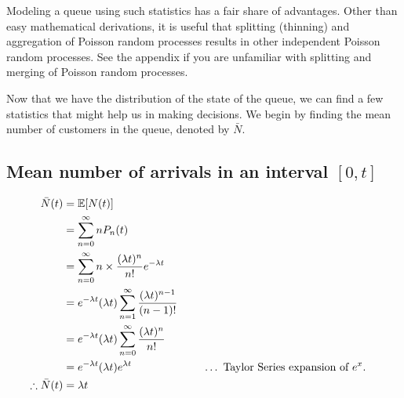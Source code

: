 \documentclass[11pt, a4paper]{report}
\begin{document}

Modeling a queue using such statistics has a fair share of advantages. Other than easy mathematical derivations, it is useful that splitting (thinning) and aggregation of Poisson random processes results in other independent Poisson random processes. See the appendix if you are unfamiliar with splitting and merging of Poisson random processes. 


Now that we have the distribution of the state of the queue, we can find a few statistics that might help us in making decisions. We begin by finding the mean number of customers in the queue, denoted by $\bar{N}$.

\subsection{Mean number of arrivals in an interval $[0, t]$}
\begin{subequations}
    \begin{align}
        \bar{N}(t) &= {\mathbb{E}}[N(t)] \\
        &= \sum_{n=0}^{\infty} n P_n(t) \\
        &= \sum_{n=0}^{\infty} n \times \frac{(\lambda t)^n}{n!} e^{-\lambda t} \\
        &= e^{-\lambda t} (\lambda t) \sum_{n=1}^{\infty} \frac{(\lambda t)^{n-1}}{(n-1)!} \\
        &= e^{-\lambda t} (\lambda t) \sum_{n=0}^{\infty} \frac{(\lambda t)^n}{n!} \\
        &=  e^{-\lambda t} (\lambda t) e^{\lambda t} &&\quad\ \ldots\ \text{Taylor Series expansion of }e^x.\\
        \therefore \bar{N}(t) &= \lambda t
    \end{align}
    \label{eq:Meanarr}
\end{subequations}

\end{document}
